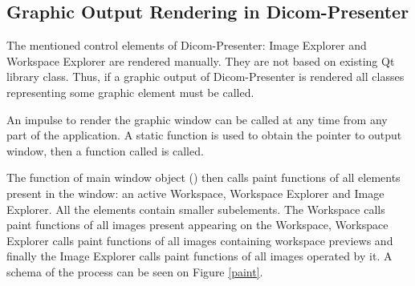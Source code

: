 \subsection{Graphic Output Rendering in Dicom-Presenter}
\label{renderingprocess}
The mentioned control elements of Dicom-Presenter: Image Explorer and Workspace Explorer are rendered manually. They are not based on existing Qt library class. Thus, if a graphic output of Dicom-Presenter is rendered all classes representing some graphic element must be called. 

An impulse to render the graphic window can be called at any time from any part of the application. A static function is used to obtain the pointer to output window, then a function called  is called.

The  function of main window object () then calls paint functions of all elements present in the window: an active Workspace, Workspace Explorer and Image Explorer. All the elements contain smaller subelements. The Workspace calls paint functions of all images present appearing on the Workspace, Workspace Explorer calls paint functions of all images containing workspace previews and finally the Image Explorer calls paint functions of all images operated by it. A schema of the process can be seen on Figure \ref{paint}.

